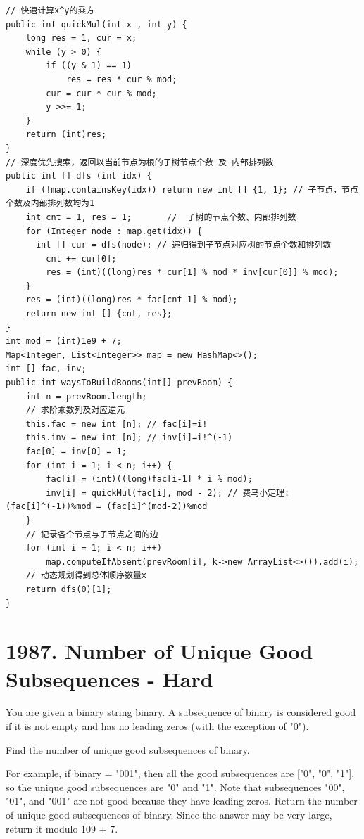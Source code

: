 \documentclass[9pt, b5paaper]{book}
\begin{document}
\begin{verbatim}
// 快速计算x^y的乘方
public int quickMul(int x , int y) {
    long res = 1, cur = x;
    while (y > 0) {
        if ((y & 1) == 1)
            res = res * cur % mod;
        cur = cur * cur % mod;
        y >>= 1;
    }
    return (int)res;
}
// 深度优先搜索，返回以当前节点为根的子树节点个数 及 内部排列数
public int [] dfs (int idx) {
    if (!map.containsKey(idx)) return new int [] {1, 1}; // 子节点，节点个数及内部排列数均为1
    int cnt = 1, res = 1;       //  子树的节点个数、内部排列数
    for (Integer node : map.get(idx)) {
      int [] cur = dfs(node); // 递归得到子节点对应树的节点个数和排列数
        cnt += cur[0];
        res = (int)((long)res * cur[1] % mod * inv[cur[0]] % mod);
    }
    res = (int)((long)res * fac[cnt-1] % mod);
    return new int [] {cnt, res};
}
int mod = (int)1e9 + 7;
Map<Integer, List<Integer>> map = new HashMap<>();
int [] fac, inv;
public int waysToBuildRooms(int[] prevRoom) {
    int n = prevRoom.length;
    // 求阶乘数列及对应逆元
    this.fac = new int [n]; // fac[i]=i!
    this.inv = new int [n]; // inv[i]=i!^(-1)
    fac[0] = inv[0] = 1;
    for (int i = 1; i < n; i++) {
        fac[i] = (int)((long)fac[i-1] * i % mod);
        inv[i] = quickMul(fac[i], mod - 2); // 费马小定理: (fac[i]^(-1))%mod = (fac[i]^(mod-2))%mod
    }
    // 记录各个节点与子节点之间的边
    for (int i = 1; i < n; i++) 
        map.computeIfAbsent(prevRoom[i], k->new ArrayList<>()).add(i);
    // 动态规划得到总体顺序数量x
    return dfs(0)[1];      
}
\end{verbatim}

\section{1987. Number of Unique Good Subsequences - Hard}
\label{sec-1-9}
You are given a binary string binary. A subsequence of binary is considered good if it is not empty and has no leading zeros (with the exception of "0").

Find the number of unique good subsequences of binary.

For example, if binary = "001", then all the good subsequences are ["0", "0", "1"], so the unique good subsequences are "0" and "1". Note that subsequences "00", "01", and "001" are not good because they have leading zeros.
Return the number of unique good subsequences of binary. Since the answer may be very large, return it modulo 109 + 7.
\end{document}
